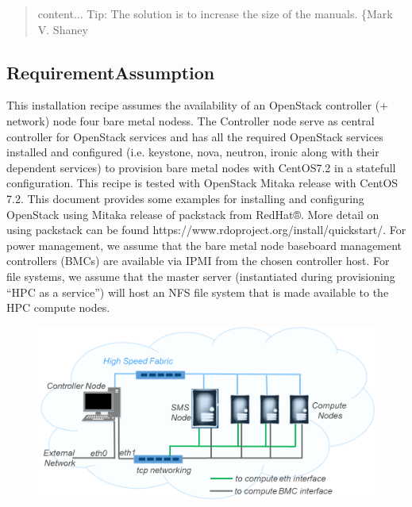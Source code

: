 \documentclass[12pt]{article}
\begin{document}
\begin{quote}	content...
\small Tip: The solution is to increase the size of the manuals. \{Mark V. Shaney\ 
\end{quote}


\subsection*{RequirementAssumption}

This installation recipe assumes the availability of an OpenStack controller (+ network) node four bare metal nodess. The Controller node serve as central controller for OpenStack services and has all the required OpenStack services installed and configured (i.e. keystone, nova, neutron, ironic along with their dependent services) to provision bare metal nodes with CentOS7.2 in a statefull configuration. 
This recipe is tested with OpenStack Mitaka release with CentOS 7.2. This document provides some examples for installing and configuring OpenStack using Mitaka release of packstack from RedHat®. More detail on using packstack can be found https://www.rdoproject.org/install/quickstart/. 
For power management, we assume that the bare metal node baseboard management controllers (BMCs) are available via IPMI from the chosen controller host. For file systems, we assume that the master server (instantiated during provisioning “HPC as a service”) will host an NFS file system that is made available to the HPC compute nodes.

\begin{figure}
	\centering
	\includegraphics[width=0.7\linewidth]{manifest/figures/HPCaaS-diagram}
	\caption[Openstack node example]{}
	\caption{}
	\label{fig:hpcaas-diagram}
\end{figure}
\end{document}
